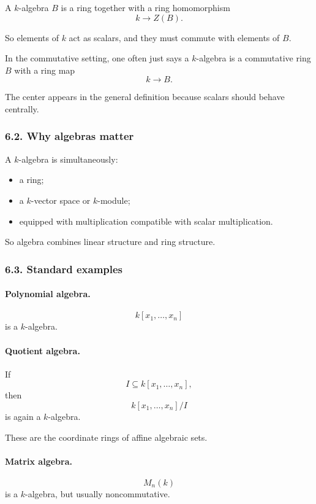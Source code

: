 \documentclass[12pt,a4paper]{article}
\theoremstyle{plain}
\theoremstyle{definition}      %
\begin{document}
	A \(k\)-algebra \(B\) is a ring together with a ring homomorphism
	\[
	k\to Z(B).
	\]
	
	So elements of \(k\) act as scalars, and they must commute with elements of \(B\).
	
	In the commutative setting, one often just says a \(k\)-algebra is a commutative ring \(B\) with a ring map
	\[
	k\to B.
	\]
	
	The center appears in the general definition because scalars should behave centrally.
	
	\subsubsection*{6.2. Why algebras matter}
	
	A \(k\)-algebra is simultaneously:
	\begin{itemize}
		\item a ring;
		\item a \(k\)-vector space or \(k\)-module;
		\item equipped with multiplication compatible with scalar multiplication.
	\end{itemize}
	
	So algebra combines linear structure and ring structure.
	
	\subsubsection*{6.3. Standard examples}
	
	\paragraph{Polynomial algebra.}
	\[
	k[x_1,\dots,x_n]
	\]
	is a \(k\)-algebra.
	
	\paragraph{Quotient algebra.}
	If
	\[
	I\subseteq k[x_1,\dots,x_n],
	\]
	then
	\[
	k[x_1,\dots,x_n]/I
	\]
	is again a \(k\)-algebra.
	
	These are the coordinate rings of affine algebraic sets.
	
	\paragraph{Matrix algebra.}
	\[
	M_n(k)
	\]
	is a \(k\)-algebra, but usually noncommutative.
	
\end{document}
